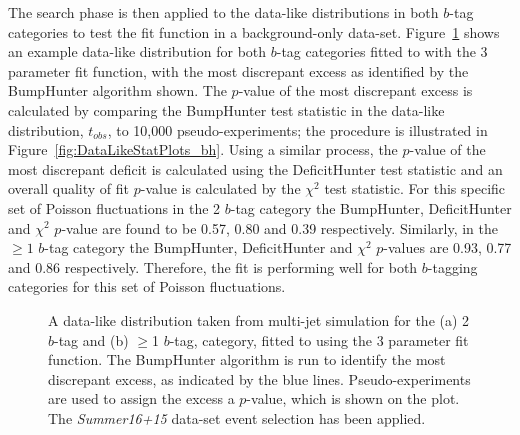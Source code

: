 The search phase is then applied to the data-like distributions
in both $b$-tag categories 
to test the fit function in a background-only data-set.
Figure~\ref{fig:DataLikeSearchPhase} shows an example data-like distribution for both $b$-tag categories fitted
to with the 3 parameter fit function,
with the most discrepant excess as identified by the BumpHunter algorithm shown.
The $p$-value of the most discrepant excess is calculated by comparing the BumpHunter test statistic in the data-like distribution, $t_{obs}$,
to 10,000 pseudo-experiments; the procedure is illustrated in Figure~\ref{fig:DataLikeStatPlots_bh}.
Using a similar process, the $p$-value of the most discrepant deficit is calculated using the DeficitHunter test statistic
and an overall quality of fit $p$-value is calculated by the $\chi^{2}$ test statistic.
For this specific set of Poisson fluctuations in the 2 $b$-tag category
the BumpHunter, DeficitHunter and  $\chi^{2}$ $p$-value are found to be
0.57, 0.80 and 0.39 respectively.
Similarly, in the $\geq1$ $b$-tag category the
BumpHunter, DeficitHunter and  $\chi^{2}$ $p$-values are
0.93, 0.77 and 0.86 respectively.
Therefore, the fit is performing well for both $b$-tagging categories for this set of Poisson fluctuations.\\

\begin{figure}[!ht]
  \begin{center}
   \captionsetup[subfigure]{aboveskip=0pt,justification=centering}
  \end{center}
  \caption{A data-like distribution taken from multi-jet simulation for the (a) 2 $b$-tag and (b) $\geq$1 $b$-tag,
    category, fitted to using the 3 parameter fit function.
    The BumpHunter algorithm is run to identify the most discrepant excess, as indicated by the blue lines.
    Pseudo-experiments are used to assign the excess a $p$-value, which is shown on the plot.
    The \textit{Summer16+15} data-set event selection has been applied.}
  \label{fig:DataLikeSearchPhase}
\end{figure}

